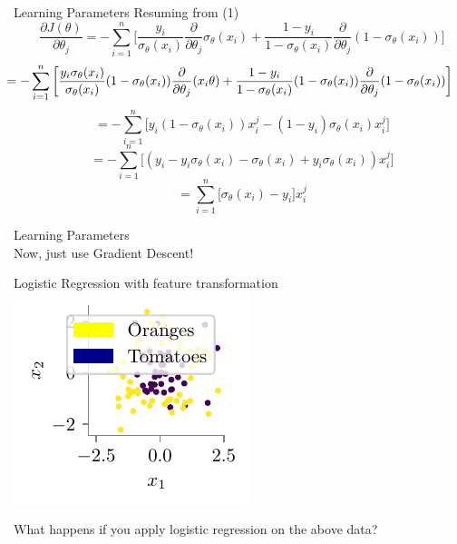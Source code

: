 \documentclass{beamer}
\begin{document}
\begin{frame}{Learning Parameters}
Resuming from (1)
\begin{equation*}
\frac{\partial J(\theta)}{\partial \theta_{j}} = -\sum_{i=1}^{n}\bigg[\frac{y_{i}}{\sigma_{\theta}(x_{i})} \frac{\partial}{\partial \theta_{j}} \sigma_{\theta}(x_{i}) + \frac{1 - y_{i}}{1 - \sigma_{\theta}(x_{i})} \frac{\partial}{\partial \theta_{j}}(1 - \sigma_{\theta}(x_{i}))\bigg]
\end{equation*}
\begin{equation*}
\hspace{-0.7cm}= -\sum_{i=1}^{n}\bigg[\frac{y_{i}\sigma_{\theta}(x_{i})}{\sigma_{\theta}(x_{i})}(1 - \sigma_{\theta}(x_{i}))\frac{\partial}{\partial \theta_{j}} (x_{i}\theta) + \frac{1 - y_{i}}{1 - \sigma_{\theta}(x_{i})}(1 - \sigma_{\theta}(x_{i})) \frac{\partial}{\partial \theta_{j}}(1 - \sigma_{\theta}(x_{i}))\bigg]
\end{equation*}
\begin{equation*}
= -\sum_{i=1}^{n}\bigg[y_{i}(1 - \sigma_{\theta}(x_{i}))x_{i}^{j} - (1 - y_{i})\sigma_{\theta}(x_{i})x_{i}^{j}\bigg]
\end{equation*}
\begin{equation*}
= -\sum_{i=1}^{n}\bigg[(y_{i} - y_{i}\sigma_{\theta}(x_{i}) - \sigma_{\theta}(x_{i}) + y_{i}\sigma_{\theta}(x_{i}))x_{i}^{j}\bigg]
\end{equation*}
\begin{equation*}
= \sum_{i=1}^{n}\bigg[\sigma_{\theta}(x_{i}) - y_{i}\bigg]x_{i}^{j}
\end{equation*}
\end{frame}
\begin{frame}{Learning Parameters}
\centering
{} \\
\vspace{0.3cm}
Now, just use Gradient Descent!
\end{frame}


\begin{frame}{Logistic Regression with feature transformation}
\includegraphics{../figures/logistic-regression/logisitic-circular-data.pdf}

What happens if you apply logistic regression on the above data?
\end{frame}
\end{document}
